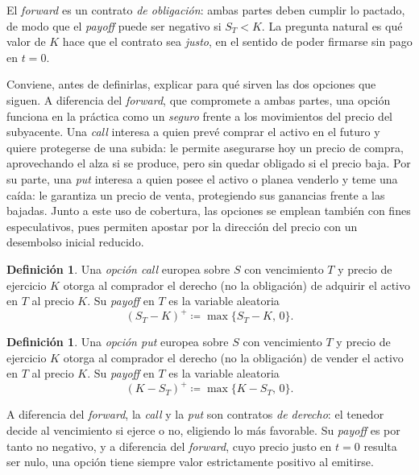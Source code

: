 \documentclass[11pt,a4paper,oneside]{report}
\theoremstyle{plain}
\theoremstyle{definition}
\newtheorem{definicion}[teorema]{Definición}
\theoremstyle{remark}
\newcommand{\1}{\mathbf{1}}
\newcommand{\eqdef}{\coloneqq}
\begin{document}
El \emph{forward} es un contrato \emph{de obligación}: ambas partes
deben cumplir lo pactado, de modo que el \emph{payoff} puede ser
negativo si $S_T < K$. La pregunta natural es qué valor de $K$ hace
que el contrato sea \emph{justo}, en el sentido de poder firmarse
sin pago en $t = 0$.

\medskip

Conviene, antes de definirlas, explicar para qué sirven las dos opciones
que siguen. A diferencia del \emph{forward}, que compromete a ambas
partes, una opción funciona en la práctica como un \emph{seguro} frente a
los movimientos del precio del subyacente. Una \emph{call} interesa a
quien prevé comprar el activo en el futuro y quiere protegerse de una
subida: le permite asegurarse hoy un precio de compra, aprovechando el
alza si se produce, pero sin quedar obligado si el precio baja. Por su parte, una
\emph{put} interesa a quien posee el activo o planea
venderlo y teme una caída: le garantiza un precio de venta, protegiendo
sus ganancias frente a las bajadas. Junto a este uso de cobertura, las
opciones se emplean también con fines especulativos, pues permiten
apostar por la dirección del precio con un desembolso inicial reducido.

\begin{definicion}
Una \emph{opción call} europea sobre $S$ con vencimiento $T$ y precio
de ejercicio $K$ otorga al comprador el derecho (no la obligación) de
adquirir el activo en $T$ al precio $K$. Su \emph{payoff} en $T$ es la
variable aleatoria
\begin{equation*}
  (S_T - K)^+ \eqdef \max\{S_T - K,\, 0\}.
\end{equation*}
\end{definicion}

\begin{definicion}
Una \emph{opción put} europea sobre $S$ con vencimiento $T$ y precio
de ejercicio $K$ otorga al comprador el derecho (no la obligación) de
vender el activo en $T$ al precio $K$. Su \emph{payoff} en $T$ es la
variable aleatoria
\begin{equation*}
  (K - S_T)^+ \eqdef \max\{K - S_T,\, 0\}.
\end{equation*}
\end{definicion}

A diferencia del \emph{forward}, la \emph{call} y la \emph{put} son
contratos \emph{de derecho}: el tenedor decide al vencimiento si
ejerce o no, eligiendo lo más favorable. Su \emph{payoff} es por
tanto no negativo, y a diferencia del \emph{forward}, cuyo precio
justo en $t = 0$ resulta ser nulo, una opción tiene siempre valor
estrictamente positivo al emitirse.
\end{document}
